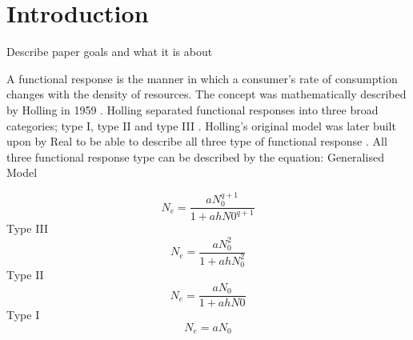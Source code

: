 \documentclass[a4paper]{article}
\numberwithin{equation}{section}
\begin{document}
\linenumbers
\section{Introduction}
Describe paper goals and what it is about


A functional response is the manner in which a consumer’s rate of consumption changes with the density of resources\cite{Dunn2020}.   The concept was mathematically described by Holling in 1959\cite{Holling1959, Holling1959a} .  Holling separated functional responses into three broad categories; type I, type II and type III \cite{Holling1959, Holling1959a}.  Holling’s original model was later built upon by Real to be able to describe all three type of functional response \cite{Real1977, Real1979}.  All three functional response type can be described by the equation: 
\newline
[Equation 1] 
\newline 
Generalised Model

\begin{equation} 
N_e = \frac{aN_0^{q+1}}{1+ahN0^{q+1}}\label{general}
\end{equation}
Type III
\begin{equation} 
N_e = \frac{aN_0^2}{1+ahN_0^2}\label{typeIII}
\end{equation}
Type II
\begin{equation}
N_e = \frac{aN_0}{1+ahN0}\label{typeII}
\end{equation}
Type I
\begin{equation}
N_e = aN_0 \label{typeI}
\end{equation}
\end{document}
